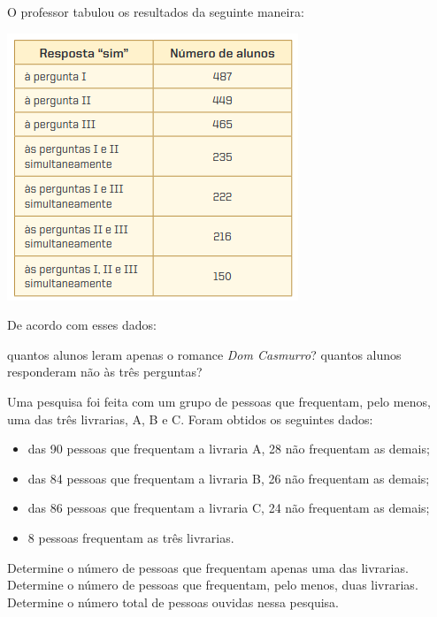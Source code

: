 \documentclass[10pt,a4paper]{article}
\begin{document}
\begin{multicols}{2}
\begin{question}[type=exam]
      O professor tabulou os resultados da seguinte maneira:

      \begin{Figure}
        \centering
        \includegraphics[scale=.8]{figures/q28.png}
      \end{Figure}
      De acordo com esses dados:

      \begin{tasks}
        \task quantos alunos leram apenas o romance \textit{Dom Casmurro}?
        \task quantos alunos responderam não às três perguntas?
      \end{tasks}

    \end{question}

    \begin{question}[type=exam]
      Uma pesquisa foi feita com um grupo de pessoas que frequentam, pelo menos, uma das três livrarias, A, B e C. Foram obtidos
      os seguintes dados:

      \begin{itemize}
        \item das 90 pessoas que frequentam a livraria A, 28 não frequentam as demais;
        \item das 84 pessoas que frequentam a livraria B, 26 não frequentam as demais;
        \item das 86 pessoas que frequentam a livraria C, 24 não frequentam as demais;
        \item 8 pessoas frequentam as três livrarias. 
      \end{itemize}

      \begin{tasks}
        \task Determine o número de pessoas que frequentam apenas uma das livrarias. 
        \task Determine o número de pessoas que frequentam, pelo menos, duas livrarias. 
        \task Determine o número total de pessoas ouvidas nessa pesquisa. 
      \end{tasks}


\end{question}
\end{multicols}
\end{document}
